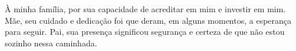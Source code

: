 À minha família, por sua capacidade de acreditar em mim e investir em mim. Mãe,
seu cuidado e dedicação foi que deram, em alguns momentos, a esperança para
seguir. Pai, sua presença significou segurança e certeza de que não estou
sozinho nessa caminhada.
